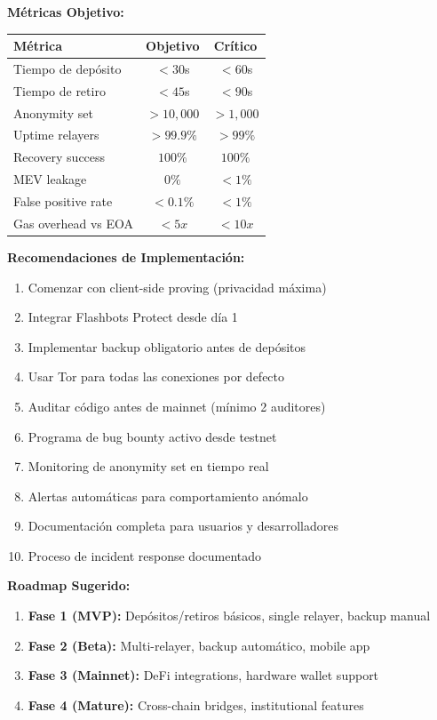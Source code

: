 \documentclass[11pt,a4paper,twoside]{book}
\theoremstyle{definition}
\theoremstyle{remark}
\begin{document}
\begin{bancozk}
\textbf{Métricas Objetivo:}
\begin{center}
\begin{tabular}{lcc}
\toprule
\textbf{Métrica} & \textbf{Objetivo} & \textbf{Crítico} \\
\midrule
Tiempo de depósito & $< 30$s & $< 60$s \\
Tiempo de retiro & $< 45$s & $< 90$s \\
Anonymity set & $> 10,000$ & $> 1,000$ \\
Uptime relayers & $> 99.9\%$ & $> 99\%$ \\
Recovery success & $100\%$ & $100\%$ \\
MEV leakage & $0\%$ & $< 1\%$ \\
False positive rate & $< 0.1\%$ & $< 1\%$ \\
Gas overhead vs EOA & $< 5x$ & $< 10x$ \\
\bottomrule
\end{tabular}
\end{center}

\textbf{Recomendaciones de Implementación:}
\begin{enumerate}
    \item Comenzar con client-side proving (privacidad máxima)
    \item Integrar Flashbots Protect desde día 1
    \item Implementar backup obligatorio antes de depósitos
    \item Usar Tor para todas las conexiones por defecto
    \item Auditar código antes de mainnet (mínimo 2 auditores)
    \item Programa de bug bounty activo desde testnet
    \item Monitoring de anonymity set en tiempo real
    \item Alertas automáticas para comportamiento anómalo
    \item Documentación completa para usuarios y desarrolladores
    \item Proceso de incident response documentado
\end{enumerate}

\textbf{Roadmap Sugerido:}
\begin{enumerate}
    \item \textbf{Fase 1 (MVP):} Depósitos/retiros básicos, single relayer, backup manual
    \item \textbf{Fase 2 (Beta):} Multi-relayer, backup automático, mobile app
    \item \textbf{Fase 3 (Mainnet):} DeFi integrations, hardware wallet support
    \item \textbf{Fase 4 (Mature):} Cross-chain bridges, institutional features
\end{enumerate}
\end{bancozk}
\end{document}
